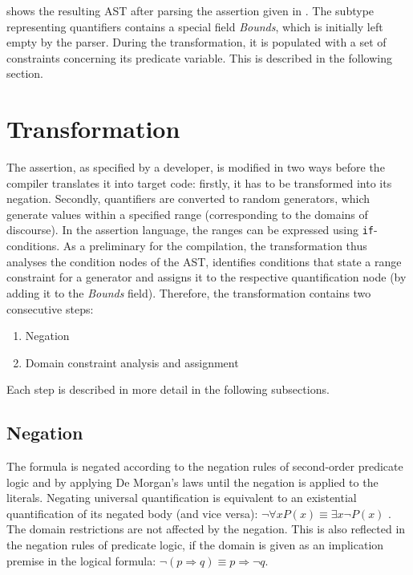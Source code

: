  shows the resulting AST after parsing the assertion given in . The subtype representing quantifiers contains a special field \textit{Bounds}, which is initially left empty by the parser. During the transformation, it is populated with a set of constraints concerning its predicate variable. This is described in the following section.

\section{Transformation}\label{sec:transformation}
The assertion, as specified by a developer, is modified in two ways before the compiler translates it into target code: firstly, it has to be transformed into its negation. Secondly, quantifiers are converted to random generators, which generate values within a specified range (corresponding to the domains of discourse). In the assertion language, the ranges can be expressed using \texttt{if}-conditions. As a preliminary for the compilation, the transformation thus analyses the condition nodes of the AST, identifies conditions that state a range constraint for a generator and assigns it to the respective quantification node (by adding it to the \textit{Bounds} field). Therefore, the transformation contains two consecutive steps:
\begin{enumerate}
\itemsep-0.5em
\item Negation
\item Domain constraint analysis and assignment
\end{enumerate}
Each step is described in more detail in the following subsections.

\subsection{Negation}
The formula is negated according to the negation rules of second-order predicate logic and by applying De Morgan's laws \cite{de_morgan} until the negation is applied to the literals. Negating universal quantification is equivalent to an existential quantification of its negated body (and vice versa): $\neg \forall x P(x) \equiv \exists x \neg P(x)$ \cite{Sundstrom2020Quantifiers}. The domain restrictions are not affected by the negation. This is also reflected in the negation rules of predicate logic, if the domain is given as an implication premise in the logical formula: $\neg (p \Rightarrow q) \equiv p \Rightarrow \neg q $. 

